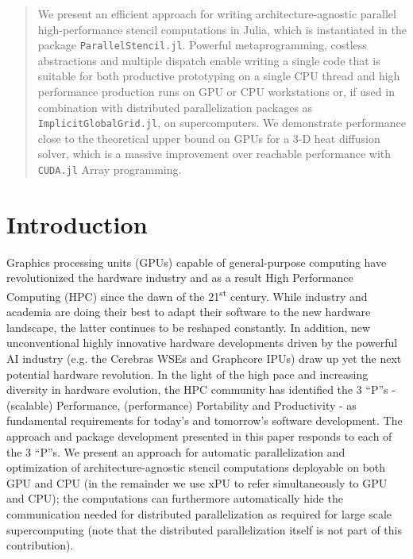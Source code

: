 \documentclass{juliacon}
\newcommand{\ts}{\textsuperscript}
\begin{document}


\maketitle

\begin{abstract}

We present an efficient approach for writing architecture-agnostic parallel high-performance stencil computations in Julia, which is instantiated in the package \texttt{ParallelStencil.jl}. Powerful metaprogramming, costless abstractions and multiple dispatch enable writing a single code that is suitable for both productive prototyping on a single CPU thread and high performance production runs on GPU or CPU workstations or, if used in combination with distributed parallelization packages as \texttt{ImplicitGlobalGrid.jl}, on supercomputers. We demonstrate performance close to the theoretical upper bound on GPUs for a 3-D heat diffusion solver, which is a massive improvement over reachable performance with \texttt{CUDA.jl} Array programming.

\end{abstract}

\section{Introduction}
Graphics processing units (GPUs) capable of general-purpose computing have revolutionized the hardware industry and as a result High Performance Computing (HPC) since the dawn of the 21\ts{st} century. While industry and academia are doing their best to adapt their software to the new hardware landscape, the latter continues to be reshaped constantly. In addition, new unconventional highly innovative hardware developments driven by the powerful AI industry (e.g. the Cerebras WSEs and Graphcore IPUs) draw up yet the next potential hardware revolution. In the light of the high pace and increasing diversity in hardware evolution, the HPC community has identified the 3 ``P''s - (scalable) Performance, (performance) Portability and Productivity - as fundamental requirements for today's and tomorrow's software development. The approach and package development presented in this paper responds to each of the 3 ``P''s. We present an approach for automatic parallelization and optimization of architecture-agnostic stencil computations deployable on both GPU and CPU (in the remainder we use xPU to refer simultaneously to GPU and CPU); the computations can furthermore automatically hide the communication needed for distributed parallelization as required for large scale supercomputing (note that the distributed parallelization itself is not part of this contribution).
\end{document}
